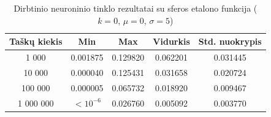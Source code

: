 \begin{table}[H]
    \centering
    \begin{tabular}{|c|c|c|c|c|}
        \hline
        \textbf{Taškų kiekis} & \textbf{Min} & \textbf{Max} & \textbf{Vidurkis} & \textbf{Std. nuokrypis} \\ \hline
        1 000        & 0.001875 & 0.129820 & 0.062201 & 0.031445 \\ \hline
        10 000       & 0.000040 & 0.125431 & 0.031658 & 0.020724 \\ \hline
        100 000      & 0.000005 & 0.065732 & 0.018920 & 0.009467 \\ \hline
        1 000 000    & $<10^{-6}$ & 0.026760 & 0.005092 & 0.003770 \\ \hline
    \end{tabular}
    \caption{Dirbtinio neuroninio tinklo rezultatai su sferos etalono funkcija ($k = 0$, $\mu = 0$, $\sigma = 5$)}
\end{table}